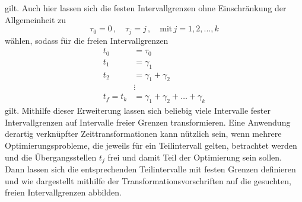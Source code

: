 gilt. Auch hier lassen sich die festen Intervallgrenzen ohne Einschränkung der Allgemeinheit zu
\begin{equation}
	\tau_0 = 0\,, \quad\tau_j = j\,, \quad\textrm{mit}\, j=1,2,...,k
\end{equation}
wählen, sodass für die freien Intervallgrenzen 
\begin{align}
t_0 &= \tau_0 \\
t_1 &= \gamma_1 \\
t_2 &= \gamma_1+\gamma_2 \\
&\vdots\\
t_f = t_k &= \gamma_1+\gamma_2+\dots+\gamma_k
\end{align}
gilt. Mithilfe dieser Erweiterung lassen sich beliebig viele Intervalle fester Intervallgrenzen auf Intervalle freier Grenzen transformieren. Eine Anwendung derartig verknüpfter Zeittransformationen kann nützlich sein, wenn mehrere Optimierungsprobleme, die jeweils für ein Teilintervall gelten, betrachtet werden und die Übergangsstellen $t_j$ frei und damit Teil der Optimierung sein sollen. Dann lassen sich die entsprechenden Teilintervalle mit festen Grenzen definieren und wie dargestellt mithilfe der Transformationsvorschriften auf die gesuchten, freien Intervallgrenzen abbilden.
